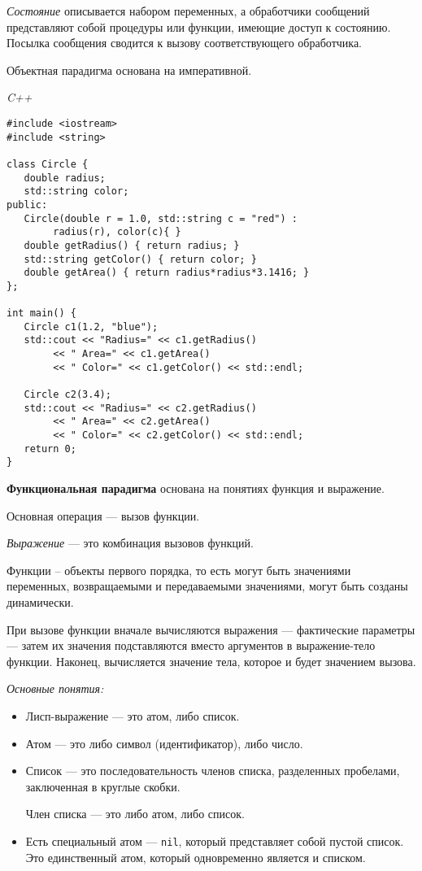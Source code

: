 \textit{Состояние} описывается набором переменных, а обработчики сообщений представляют собой процедуры или функции, имеющие доступ к состоянию.
Посылка сообщения сводится к вызову соответствующего обработчика.

Объектная парадигма основана на императивной.

\textit{C++}
    
\begin{lstlisting}[basicstyle=\ttfamily\small, frame=single]
#include <iostream>
#include <string>
 
class Circle {
   double radius;
   std::string color;
public:
   Circle(double r = 1.0, std::string c = "red") :
        radius(r), color(c){ }
   double getRadius() { return radius; }
   std::string getColor() { return color; }
   double getArea() { return radius*radius*3.1416; }
};
 
int main() {
   Circle c1(1.2, "blue");
   std::cout << "Radius=" << c1.getRadius()
        << " Area=" << c1.getArea()
        << " Color=" << c1.getColor() << std::endl;
 
   Circle c2(3.4);
   std::cout << "Radius=" << c2.getRadius()
        << " Area=" << c2.getArea()
        << " Color=" << c2.getColor() << std::endl;
   return 0;
}
\end{lstlisting}
    
\bigbreak
\textbf{Функциональная парадигма} основана на понятиях функция и выражение.

Основная операция --- вызов функции.

\textit{Выражение} --- это комбинация вызовов функций. 

Функции -- объекты первого порядка, то есть могут быть значениями переменных, возвращаемыми и передаваемыми значениями, могут быть созданы динамически.

При вызове функции вначале вычисляются выражения --- фактические параметры --- затем их значения подставляются вместо аргументов в выражение-тело функции.
Наконец, вычисляется значение тела, которое и будет значением вызова.

\textit{Основные понятия:}
\begin{itemize}
    \item Лисп-выражение --- это атом, либо список.
    \item Атом --- это либо символ (идентификатор), либо число.
    \item Список --- это последовательность членов списка, разделенных пробелами, заключенная в круглые скобки.
    
    Член списка — это либо атом, либо список.
    \item Есть специальный атом --- \texttt{nil}, который представляет собой пустой список. 
    Это единственный атом, который одновременно является и списком.
\end{itemize}

